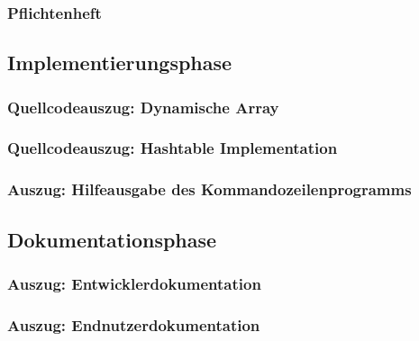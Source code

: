 \subsubsection{Pflichtenheft}

\subsection{Implementierungsphase}
\subsubsection{Quellcodeauszug: Dynamische Array}


\subsubsection{Quellcodeauszug: Hashtable Implementation}


\subsubsection{Auszug: Hilfeausgabe des Kommandozeilenprogramms}

\subsection{Dokumentationsphase}
\subsubsection{Auszug: Entwicklerdokumentation}


\subsubsection{Auszug: Endnutzerdokumentation}


